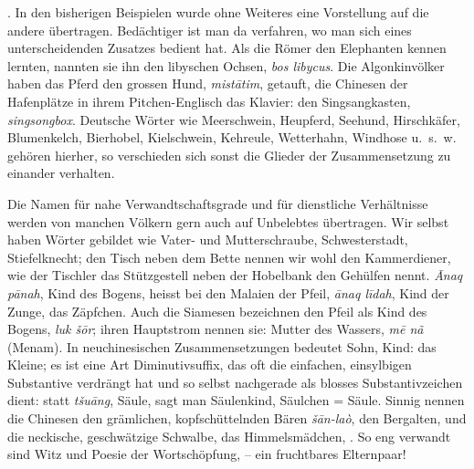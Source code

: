 . In den bisherigen Beispielen wurde ohne Weiteres eine Vorstellung auf die andere übertragen. Bedächtiger ist man da verfahren, wo man sich eines unterscheidenden Zusatzes bedient hat. Als die Römer den Elephanten kennen lernten, nannten sie ihn den libyschen Ochsen, \textit{bos libycus}. Die Algonkinvölker haben das Pferd den grossen Hund, \textit{mistātim}, getauft, die Chinesen der Hafenplätze in ihrem Pitchen-Englisch das Klavier: den Singsangkasten, \textit{singsongbox}. Deutsche Wörter wie Meerschwein, Heupferd, Seehund, Hirschkäfer, Blumenkelch, Bierhobel, Kielschwein, Kehreule, Wetterhahn, Windhose u.~s.~w. gehören hierher, so verschieden sich sonst die Glieder der Zusammensetzung zu einander verhalten.

Die Namen für nahe Verwandtschaftsgrade und für dienstliche Verhältnisse \label{sp.42} werden von manchen Völkern gern auch auf Unbelebtes übertragen. Wir selbst haben Wörter gebildet wie Vater- und Mutterschraube, \label{fp.42} Schwesterstadt, Stiefelknecht; den Tisch neben dem Bette nennen wir wohl den Kammerdiener, wie der Tischler das Stützgestell neben der Hobelbank den Gehülfen nennt. \textit{Ānaq pānah}, Kind des Bogens, heisst bei den Malaien der Pfeil, \textit{ānaq līdah}, Kind der Zunge, das Zäpfchen. Auch die Siamesen bezeichnen den Pfeil als Kind des Bogens, \textit{luk šōr}; ihren Hauptstrom nennen sie: Mutter des Wassers, \textit{mē nã} (Menam). In neuchinesischen Zusammensetzungen bedeutet  Sohn, Kind: das Kleine; es ist eine Art Diminutivsuffix, das oft die einfachen, einsylbigen Substantive verdrängt hat und so selbst nachgerade als blosses Substantivzeichen dient: statt \textit{tšuāng}, Säule, sagt man  Säulenkind, Säulchen = Säule. Sinnig nennen die Chinesen den grämlichen, kopfschüttelnden Bären \textit{šān-laò}, den Bergalten, und die neckische, geschwätzige Schwalbe, das Himmelsmädchen, . So eng verwandt sind Witz und Poesie der Wortschöpfung, – ein fruchtbares Elternpaar!


